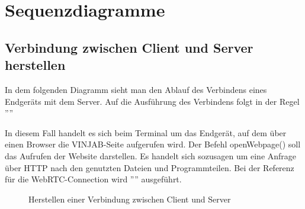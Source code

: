 \documentclass[entwurf.tex]{subfiles}
\begin{document}
\chapter{Sequenzdiagramme}
	\section{Verbindung zwischen Client und Server herstellen}
	\label{Sequence:TerminalConnect}
		In dem folgenden Diagramm sieht man den Ablauf des Verbindens eines Endgeräts mit dem Server. Auf die Ausführung des Verbindens folgt in der Regel ''''
		
		In diesem Fall handelt es sich beim Terminal um das Endgerät, auf dem über einen Browser die VINJAB-Seite aufgerufen wird. Der Befehl openWebpage() soll das Aufrufen der Website darstellen. Es handelt sich sozusagen um eine Anfrage über HTTP nach den genutzten Dateien und Programmteilen. Bei der Referenz für die WebRTC-Connection wird '''' ausgeführt.
		
		\begin{figure}[H]
  			\caption{Herstellen einer Verbindung zwischen Client und Server}
  		\end{figure}
  		
\end{document}
